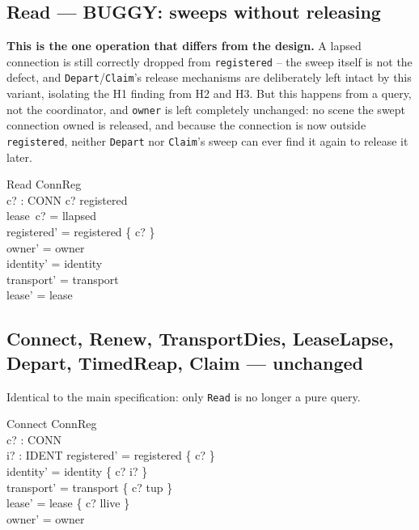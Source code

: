 \documentclass[a4paper,10pt,fleqn]{article}
\begin{document}
\subsection{Read --- BUGGY: sweeps without releasing}
\label{sec:read}

\textbf{This is the one operation that differs from the design.} A
lapsed connection is still correctly dropped from \texttt{registered} --
the sweep itself is not the defect, and \texttt{Depart}/\texttt{Claim}'s
release mechanisms are deliberately left intact by this variant,
isolating the H1 finding from H2 and H3. But this happens from a query,
not the coordinator, and \texttt{owner} is left completely unchanged: no
scene the swept connection owned is released, and because the connection
is now outside \texttt{registered}, neither \texttt{Depart} nor
\texttt{Claim}'s sweep can ever find it again to release it later.

\begin{schema}{Read}
  \Delta ConnReg \\
  c? : CONN
\where
  c? \in registered \\
  lease~c? = llapsed \\
  registered' = registered \setminus \{ c? \} \\
  owner' = owner \\
  identity' = identity \\
  transport' = transport \\
  lease' = lease
\end{schema}

\subsection{Connect, Renew, TransportDies, LeaseLapse, Depart, TimedReap, Claim --- unchanged}

Identical to the main specification: only \texttt{Read} is no longer a
pure query.

\begin{schema}{Connect}
  \Delta ConnReg \\
  c? : CONN \\
  i? : IDENT
\where
  registered' = registered \cup \{ c? \} \\
  identity' = identity \oplus \{ c? \mapsto i? \} \\
  transport' = transport \oplus \{ c? \mapsto tup \} \\
  lease' = lease \oplus \{ c? \mapsto llive \} \\
  owner' = owner
\end{schema}
\end{document}
